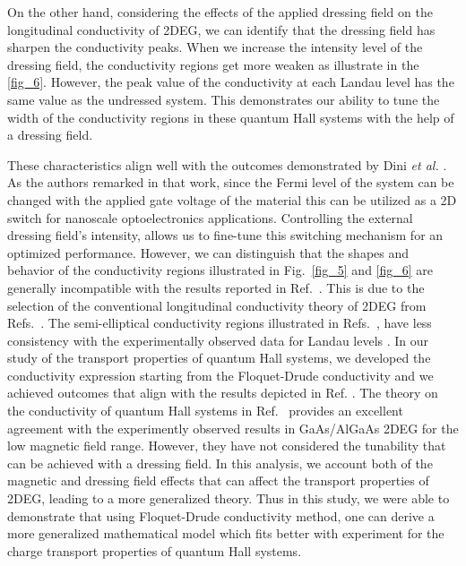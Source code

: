 On the other hand, considering the effects of the applied dressing field on the longitudinal conductivity of 2DEG, we can identify that the dressing field has sharpen the conductivity peaks.
When we increase the intensity level of the dressing field, the conductivity regions get more weaken as illustrate in the \ref{fig_6}.
However, the peak value of the conductivity at each Landau level has the same value as the undressed system. This demonstrates our ability to tune the width of the conductivity regions in these quantum Hall systems with the help of a dressing field.

These characteristics align well with the outcomes demonstrated by Dini \textit{et al.} \cite{dini16}.  As the authors remarked in that work, since the Fermi level of the system can be changed with the applied gate voltage of the material this can be utilized as a 2D switch for nanoscale optoelectronics applications. Controlling  the external dressing field's intensity, allows us to fine-tune this switching mechanism for an optimized performance.
However, we can distinguish that the shapes and behavior of the conductivity regions illustrated in Fig.~\ref{fig_5} and \ref{fig_6} are generally incompatible with the results reported in Ref.~\cite{dini16}. This is due to the selection of the conventional longitudinal conductivity theory of 2DEG from Refs.~\cite{ando74_1,ando82}. The semi-elliptical conductivity regions illustrated in Refs.~\cite{dini16,ando74_1,ando82}, have less consistency with the experimentally observed data for Landau levels \cite{endo09}.
In our study of the transport properties of quantum Hall systems, we developed the conductivity expression starting from the Floquet-Drude conductivity \cite{wackerl20} and we achieved outcomes that align with the results depicted in Ref. \cite{endo09}.
The theory on the conductivity of quantum Hall systems in Ref.~\cite{endo09} provides an excellent agreement with the experimently observed results in GaAs/AlGaAs 2DEG for the low magnetic field range.
However, they have not considered the tunability that can be achieved with a dressing field. In this analysis, we account both of the magnetic and dressing field effects that can affect the transport properties of 2DEG, leading to a more generalized theory. Thus in this study, we were able to demonstrate that using Floquet-Drude conductivity method, one can derive a more generalized mathematical model which fits better with experiment for the charge transport properties of quantum Hall systems.
